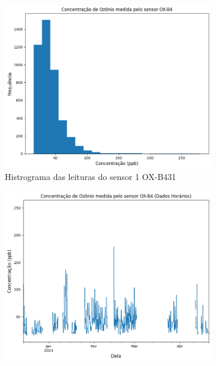 \begin{figure}[h]
    \centering
    \caption{Histogramas e séries temporais horárias das leituras dos sensores OX-B431}
    \begin{subfigure}{0.495\textwidth}
        \includegraphics[width=\textwidth]{chapters/3-RESULTADOS CAMPO/Figuras/preproc-hist-ox-b4-1.png}
        \caption{Histrograma das leituras do sensor 1 OX-B431}
        \label{fig:data-o3-1-preproc-hist}
    \end{subfigure}
    \hfill
    \begin{subfigure}{0.495\textwidth}
        \includegraphics[width=\textwidth]{chapters/3-RESULTADOS CAMPO/Figuras/preproc-1HR-ox-b4-1.png}

\end{subfigure}
\end{figure}
